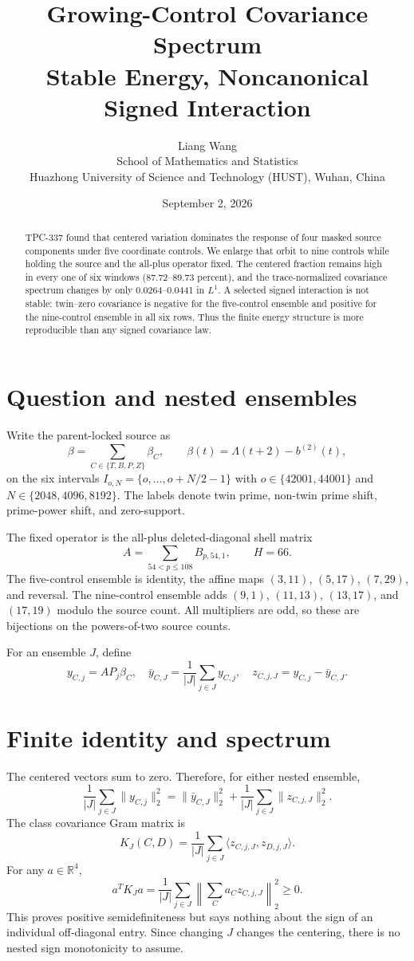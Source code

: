 \documentclass[10pt]{article}
\title{Growing-Control Covariance Spectrum\\
\large Stable Energy, Noncanonical Signed Interaction}
\author{Liang Wang\\School of Mathematics and Statistics\\
Huazhong University of Science and Technology (HUST), Wuhan, China}
\date{September 2, 2026}
\begin{document}
\maketitle

\begin{abstract}
TPC-337 found that centered variation dominates the response of four masked
source components under five coordinate controls.  We enlarge that orbit to
nine controls while holding the source and the all-plus operator fixed.  The
centered fraction remains high in every one of six windows (87.72--89.73
percent), and the trace-normalized covariance spectrum changes by only
0.0264--0.0441 in $L^1$.  A selected signed interaction is not stable:
twin--zero covariance is negative for the five-control ensemble and positive
for the nine-control ensemble in all six rows.  Thus the finite energy
structure is more reproducible than any signed covariance law.
\end{abstract}

\section{Question and nested ensembles}

Write the parent-locked source as
\[
 \beta=\sum_{C\in\{T,B,P,Z\}}\beta_C,
 \qquad \beta(t)=\Lambda(t+2)-b^{(2)}(t),
\]
on the six intervals $I_{o,N}=\{o,\ldots,o+N/2-1\}$ with
$o\in\{42001,44001\}$ and $N\in\{2048,4096,8192\}$.  The labels denote
twin prime, non-twin prime shift, prime-power shift, and zero-support.

The fixed operator is the all-plus deleted-diagonal shell matrix
\[
 A=\sum_{54<p\le108}B_{p,54,1},\qquad H=66.
\]
The five-control ensemble is identity, the affine maps $(3,11)$, $(5,17)$,
$(7,29)$, and reversal.  The nine-control ensemble adds $(9,1)$, $(11,13)$,
$(13,17)$, and $(17,19)$ modulo the source count.  All multipliers are odd,
so these are bijections on the powers-of-two source counts.

For an ensemble $J$, define
\[
 y_{C,j}=AP_j\beta_C,\quad
 \bar y_{C,J}=\frac1{|J|}\sum_{j\in J}y_{C,j},\quad
 z_{C,j,J}=y_{C,j}-\bar y_{C,J}.
\]

\section{Finite identity and spectrum}

The centered vectors sum to zero.  Therefore, for either nested ensemble,
\begin{equation}\label{eq:split}
 \frac1{|J|}\sum_{j\in J}\|y_{C,j}\|_2^2
 =\|\bar y_{C,J}\|_2^2+
 \frac1{|J|}\sum_{j\in J}\|z_{C,j,J}\|_2^2.
\end{equation}
The class covariance Gram matrix is
\[
 K_J(C,D)=\frac1{|J|}\sum_{j\in J}
 \langle z_{C,j,J},z_{D,j,J}\rangle.
\]
For any $a\in\mathbb R^4$,
\[
 a^TK_Ja=\frac1{|J|}\sum_{j\in J}
 \left\|\sum_Ca_Cz_{C,j,J}\right\|_2^2\ge0.
\]
This proves positive semidefiniteness but says nothing about the sign of an
individual off-diagonal entry.  Since changing $J$ changes the centering,
there is no nested sign monotonicity to assume.
\end{document}

